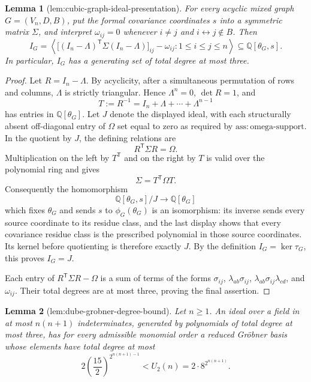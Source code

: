 \documentclass{article}
\newtheorem{lemma}{Lemma}
\begin{document}
\begin{lemma}[lem:cubic-graph-ideal-presentation]\label{lem:cubic-graph-ideal-presentation}
For every acyclic mixed graph \(G=(V_n,D,B)\), put the formal covariance coordinates \(s\) into a symmetric matrix \(\Sigma\), and interpret \(\omega_{ij}=0\) whenever \(i\neq j\) and \(i\leftrightarrow j\notin B\).  Then
\[
 I_G=\left\langle
 \bigl[(I_n-\Lambda)^{\mathsf T}\Sigma(I_n-\Lambda)\bigr]_{ij}-\omega_{ij}:1\leq i\leq j\leq n
 \right\rangle
 \subseteq\mathbb Q[\theta_G,s].
\]
In particular, \(I_G\) has a generating set of total degree at most three.
\end{lemma}
\begin{proof}
Let \(R=I_n-\Lambda\).  By acyclicity, after a simultaneous permutation of rows and columns, \(\Lambda\) is strictly triangular.  Hence \(\Lambda^n=0\), \(\det R=1\), and
\[
 T:=R^{-1}=I_n+\Lambda+\cdots+\Lambda^{n-1}
\]
has entries in \(\mathbb Q[\theta_G]\).  Let \(J\) denote the displayed ideal, with each structurally absent off-diagonal entry of \(\Omega\) set equal to zero as required by \(\mathrm{ass:omega\mbox{-}support}\).  In the quotient by \(J\), the defining relations are
\[
 R^{\mathsf T}\Sigma R=\Omega.
\]
Multiplication on the left by \(T^{\mathsf T}\) and on the right by \(T\) is valid over the polynomial ring and gives
\[
 \Sigma=T^{\mathsf T}\Omega T.
\]
Consequently the homomorphism
\[
 \mathbb Q[\theta_G,s]/J\longrightarrow\mathbb Q[\theta_G]
\]
which fixes \(\theta_G\) and sends \(s\) to \(\phi_G(\theta_G)\) is an isomorphism: its inverse sends every source coordinate to its residue class, and the last display shows that every covariance residue class is the prescribed polynomial in those source coordinates.  Its kernel before quotienting is therefore exactly \(J\).  By the definition \(I_G=\ker\tau_G\), this proves \(I_G=J\).

Each entry of \(R^{\mathsf T}\Sigma R-\Omega\) is a sum of terms of the forms \(\sigma_{ij}\), \(\lambda_{ab}\sigma_{ij}\), \(\lambda_{ab}\sigma_{ij}\lambda_{cd}\), and \(\omega_{ij}\).  Their total degrees are at most three, proving the final assertion.
\end{proof}

\begin{lemma}[lem:dube-grobner-degree-bound]\label{lem:dube-grobner-degree-bound}
Let \(n\geq1\).  An ideal over a field in at most \(n(n+1)\) indeterminates, generated by polynomials of total degree at most three, has for every admissible monomial order a reduced Gr\"obner basis whose elements have total degree at most
\[
 2\left(\frac{15}{2}\right)^{2^{n(n+1)-1}}<U_2(n)=2\cdot8^{2^{n(n+1)}}.
\]
\end{lemma}
\end{document}
